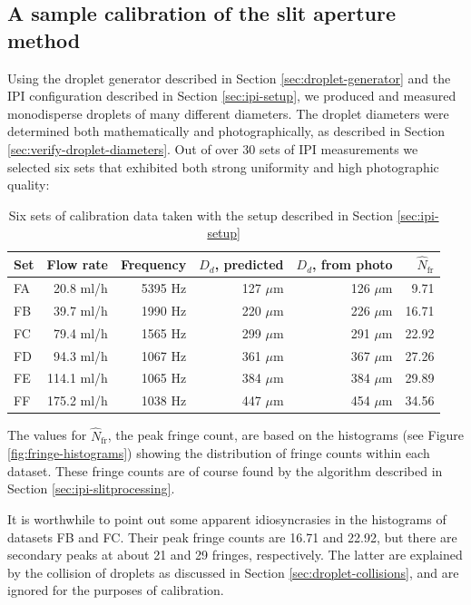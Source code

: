 \documentclass[11.5pt]{book}
\begin{document}
\subsection{A sample calibration of the slit aperture method}
Using the droplet generator described in Section \ref{sec:droplet-generator} and
the IPI configuration described in Section \ref{sec:ipi-setup}, we produced and
measured monodisperse droplets of many different diameters. The droplet
diameters were determined both mathematically and photographically, as described
in Section \ref{sec:verify-droplet-diameters}. Out of over 30 sets of IPI
measurements we selected six sets that exhibited both strong uniformity and
high photographic quality:

\begin{table}[h]
    \centering
    \begin{tabular}{lrrrrr}
    \toprule
    Set & Flow rate & Frequency & $D_d$, predicted  & $D_d$, from
photo & $\hat{N}_\text{fr}$ \\
    \midrule
    FA & 20.8  ml/h  & 5395 Hz  & 127 $\mu$m  & 126 $\mu$m &  9.71      \\
    FB & 39.7  ml/h  & 1990 Hz  & 220 $\mu$m  & 226 $\mu$m &  16.71     \\
    FC & 79.4  ml/h  & 1565 Hz  & 299 $\mu$m  & 291 $\mu$m &  22.92     \\
    FD & 94.3  ml/h  & 1067 Hz  & 361 $\mu$m  & 367 $\mu$m &  27.26     \\
    FE & 114.1 ml/h  & 1065 Hz  & 384 $\mu$m  & 384 $\mu$m &  29.89     \\
    FF & 175.2 ml/h  & 1038 Hz  & 447 $\mu$m  & 454 $\mu$m &  34.56     \\
    \bottomrule
\end{tabular}
\caption{Six sets of calibration data taken with the setup described in Section
\ref{sec:ipi-setup}}
\label{tab:ipi-calibration-datasets}
\end{table}
The values for $\hat{N}_\text{fr}$, the peak fringe count, are based on the
histograms (see Figure \ref{fig:fringe-histograms}) showing the distribution of
fringe counts within each dataset. These fringe counts are of course found by
the algorithm described in Section \ref{sec:ipi-slitprocessing}.

It is worthwhile to point out some apparent idiosyncrasies in the histograms of
datasets FB and FC. Their peak fringe counts are 16.71 and 22.92, but there
are secondary peaks at about 21 and 29 fringes, respectively. The latter are
explained by the collision of droplets as discussed in Section
\ref{sec:droplet-collisions}, and are ignored for the purposes of calibration.
\end{document}
